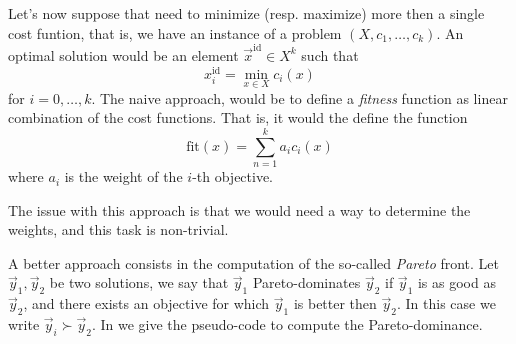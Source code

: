 \documentclass{subfiles}
\begin{document}
    Let's now suppose that need to minimize (resp. maximize) more then a single cost funtion,
        that is, we have an instance of a problem $(X, c_{1}, \ldots, c_{k})$.
        An optimal solution would be an element $\vec{x}^{\mathrm{id}} \in X^{k}$
        such that 
        $$
            x_{i}^{\mathrm{id}} = \min\limits_{x \in X} c_{i}(x)
        $$
        for $i = 0, \ldots, k$. The naive approach,
        would be to define a \emph{fitness} function as linear combination of the cost functions.
        That is, it would the define the function
        $$
            \mathrm{fit}(x) = \sum\limits_{n = 1}^{k} a_{i} c_{i}(x)
        $$
        where $a_{i}$ is the weight of the $i$-th objective.

    The issue with this approach is that we would need a way to determine the weights,
        and this task is non-trivial.

    A better approach consists in the computation of the so-called \emph{Pareto} front.
        Let $\vec{y}_{1}, \vec{y}_{2}$ be two solutions,
        we say that $\vec{y}_{1}$ Pareto-dominates $\vec{y}_{2}$ if $\vec{y}_{1}$ is as good as $\vec{y}_{2}$,
        and there exists an objective for which $\vec{y}_{1}$ is better then $\vec{y}_{2}$.
        In this case we write $\vec{y}_{i} \succ \vec{y}_{2}$.
        In  we give the pseudo-code to compute the Pareto-dominance.
        
\end{document}
